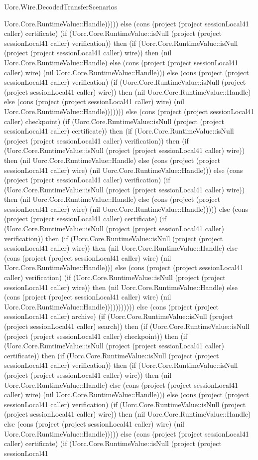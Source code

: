 \begin{lexlean}{Uorc.Wire.DecodedTransferScenarios}
\begin{semanticmodule}
{Uorc.Core.RuntimeValue::Handle))))) else (cons (project (project sessionLocal41 caller) certificate) (if (Uorc.Core.RuntimeValue::isNull (project (project sessionLocal41 caller) verification)) then (if (Uorc.Core.RuntimeValue::isNull (project (project sessionLocal41 caller) wire)) then (nil Uorc.Core.RuntimeValue::Handle) else (cons (project (project sessionLocal41 caller) wire) (nil Uorc.Core.RuntimeValue::Handle))) else (cons (project (project sessionLocal41 caller) verification) (if (Uorc.Core.RuntimeValue::isNull (project (project sessionLocal41 caller) wire)) then (nil Uorc.Core.RuntimeValue::Handle) else (cons (project (project sessionLocal41 caller) wire) (nil Uorc.Core.RuntimeValue::Handle))))))) else (cons (project (project sessionLocal41 caller) checkpoint) (if (Uorc.Core.RuntimeValue::isNull (project (project sessionLocal41 caller) certificate)) then (if (Uorc.Core.RuntimeValue::isNull (project (project sessionLocal41 caller) verification)) then (if (Uorc.Core.RuntimeValue::isNull (project (project sessionLocal41 caller) wire)) then (nil Uorc.Core.RuntimeValue::Handle) else (cons (project (project sessionLocal41 caller) wire) (nil Uorc.Core.RuntimeValue::Handle))) else (cons (project (project sessionLocal41 caller) verification) (if (Uorc.Core.RuntimeValue::isNull (project (project sessionLocal41 caller) wire)) then (nil Uorc.Core.RuntimeValue::Handle) else (cons (project (project sessionLocal41 caller) wire) (nil Uorc.Core.RuntimeValue::Handle))))) else (cons (project (project sessionLocal41 caller) certificate) (if (Uorc.Core.RuntimeValue::isNull (project (project sessionLocal41 caller) verification)) then (if (Uorc.Core.RuntimeValue::isNull (project (project sessionLocal41 caller) wire)) then (nil Uorc.Core.RuntimeValue::Handle) else (cons (project (project sessionLocal41 caller) wire) (nil Uorc.Core.RuntimeValue::Handle))) else (cons (project (project sessionLocal41 caller) verification) (if (Uorc.Core.RuntimeValue::isNull (project (project sessionLocal41 caller) wire)) then (nil Uorc.Core.RuntimeValue::Handle) else (cons (project (project sessionLocal41 caller) wire) (nil Uorc.Core.RuntimeValue::Handle))))))))))) else (cons (project (project sessionLocal41 caller) archive) (if (Uorc.Core.RuntimeValue::isNull (project (project sessionLocal41 caller) search)) then (if (Uorc.Core.RuntimeValue::isNull (project (project sessionLocal41 caller) checkpoint)) then (if (Uorc.Core.RuntimeValue::isNull (project (project sessionLocal41 caller) certificate)) then (if (Uorc.Core.RuntimeValue::isNull (project (project sessionLocal41 caller) verification)) then (if (Uorc.Core.RuntimeValue::isNull (project (project sessionLocal41 caller) wire)) then (nil Uorc.Core.RuntimeValue::Handle) else (cons (project (project sessionLocal41 caller) wire) (nil Uorc.Core.RuntimeValue::Handle))) else (cons (project (project sessionLocal41 caller) verification) (if (Uorc.Core.RuntimeValue::isNull (project (project sessionLocal41 caller) wire)) then (nil Uorc.Core.RuntimeValue::Handle) else (cons (project (project sessionLocal41 caller) wire) (nil Uorc.Core.RuntimeValue::Handle))))) else (cons (project (project sessionLocal41 caller) certificate) (if (Uorc.Core.RuntimeValue::isNull (project (project sessionLocal41 }
\end{semanticmodule}
\end{lexlean}
